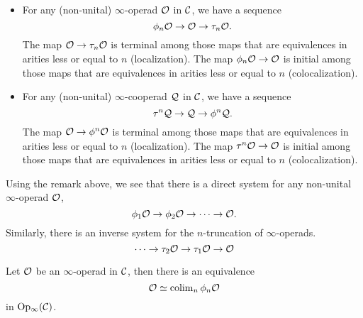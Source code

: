 \begin{remark}
\begin{itemize}
	\item For any (non-unital) $\infty$-operad ${\mathcal{O}}$ in ${\mathcal{C}}$, we have a sequence
	\[
	\phi_n{\mathcal{O}} \to {\mathcal{O}} \to \tau_n {\mathcal{O}}.
	\]
	The map ${\mathcal{O}} \to \tau_n {\mathcal{O}}$ is terminal among those maps that are equivalences in arities less or equal to $n$ (localization).
	The map $\phi_n{\mathcal{O}} \to {\mathcal{O}}$ is initial among those maps that are equivalences in arities less or equal to $n$ (colocalization).

	\item For any (non-unital) $\infty$-cooperad ${\mathcal{Q}}$ in ${\mathcal{C}}$, we have a sequence
	\[
	\tau^n {\mathcal{Q}} \to {\mathcal{Q}} \to \phi^n {\mathcal{Q}}.
	\]
	The map ${\mathcal{O}} \to \phi^n {\mathcal{O}}$ is terminal among those maps that are equivalences in arities less or equal to $n$ (localization).
	The map $\tau^n{\mathcal{O}} \to {\mathcal{O}}$ is initial among those maps that are equivalences in arities less or equal to $n$ (colocalization).
\end{itemize}
	
\end{remark}

\begin{remark}
	Using the remark above, we see that there is a direct system for any non-unital $\infty$-operad ${\mathcal{O}}$, 
\begin{equation}
\phi_1{\mathcal{O}} \to \phi_2{\mathcal{O}} \to \cdots \to {\mathcal{O}}.
\end{equation}
Similarly, there is an inverse system for the $n$-truncation of $\infty$-operads.
\begin{equation}
\cdots \to 
\tau_2 {\mathcal{O}}
\to 
\tau_1 {\mathcal{O}}
\to 
{\mathcal{O}}
\end{equation}
\end{remark}



\begin{proposition}
	Let ${\mathcal{O}}$ be an $\infty$-operad in ${\mathcal{C}}$, 
	then there is an equivalence
	\[
	{\mathcal{O}} \simeq
	\operatorname{colim}_n \phi_n {\mathcal{O}}
	\]
	in $\operatorname{Op_{\infty}}({\mathcal{C}})$.
\end{proposition}





